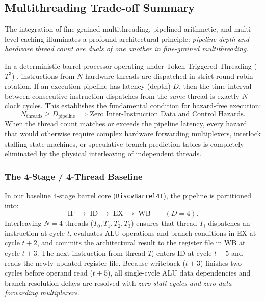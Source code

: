 \subsection{Multithreading Trade-off Summary}\label{subsec:mt_tradeoff_summary}

The integration of fine-grained multithreading, pipelined arithmetic, and multi-level caching illuminates a profound architectural principle: \textit{pipeline depth and hardware thread count are duals of one another in fine-grained multithreading}. 

In a deterministic barrel processor operating under Token-Triggered Threading ($T^3$) \cite{glossner2003sandblaster}, instructions from $N$ hardware threads are dispatched in strict round-robin rotation. If an execution pipeline has latency (depth) $D$, then the time interval between consecutive instruction dispatches from the \emph{same} thread is exactly $N$ clock cycles. This establishes the fundamental condition for hazard-free execution:
\begin{equation}
N_{\text{threads}} \ge D_{\text{pipeline}} \implies \text{Zero Inter-Instruction Data and Control Hazards}.
\end{equation}
When the thread count matches or exceeds the pipeline latency, every hazard that would otherwise require complex hardware forwarding multiplexers, interlock stalling state machines, or speculative branch prediction tables is completely eliminated by the physical interleaving of independent threads.

\subsubsection{The 4-Stage / 4-Thread Baseline}
In our baseline 4-stage barrel core (\texttt{RiscvBarrel4T}), the pipeline is partitioned into:
\begin{equation}
\text{IF} \;\longrightarrow\; \text{ID} \;\longrightarrow\; \text{EX} \;\longrightarrow\; \text{WB} \qquad (D = 4).
\end{equation}
Interleaving $N = 4$ threads ($T_0, T_1, T_2, T_3$) ensures that thread $T_i$ dispatches an instruction at cycle $t$, evaluates ALU operations and branch conditions in EX at cycle $t+2$, and commits the architectural result to the register file in WB at cycle $t+3$. The next instruction from thread $T_i$ enters ID at cycle $t+5$ and reads the newly updated register file. Because writeback ($t+3$) finishes two cycles before operand read ($t+5$), all single-cycle ALU data dependencies and branch resolution delays are resolved with \textit{zero stall cycles and zero data forwarding multiplexers}.


